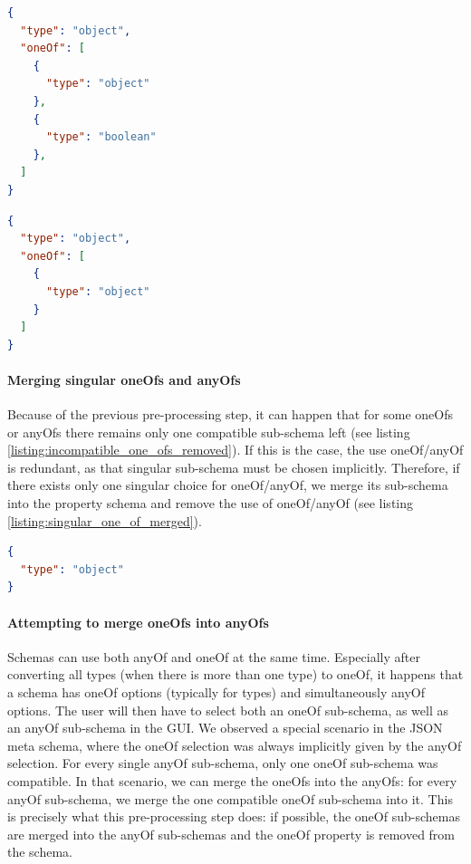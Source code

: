 \begin{lstlisting}[language=json, firstnumber=1, caption=
    {Simple JSON schema with incompatible oneOf option}, captionpos=b]
{
  "type": "object",
  "oneOf": [
    {
      "type": "object"
    },
    {
      "type": "boolean"
    },
  ]
}
\end{lstlisting}\label{listing:incompatible_one_ofs}


\begin{lstlisting}[language=json, firstnumber=1, caption=
    {Simple JSON schema with incompatible oneOf option removed}, captionpos=b]
{
  "type": "object",
  "oneOf": [
    {
      "type": "object"
    }
  ]
}
\end{lstlisting}\label{listing:incompatible_one_ofs_removed}


\paragraph{Merging singular oneOfs and anyOfs}
Because of the previous pre-processing step, it can happen that for some oneOfs or anyOfs there remains only one compatible sub-schema left (see listing \ref{listing:incompatible_one_ofs_removed}).
If this is the case, the use oneOf/anyOf is redundant, as that singular sub-schema must be chosen implicitly.
Therefore, if there exists only one singular choice for oneOf/anyOf, we merge its sub-schema into the property schema and remove the use of oneOf/anyOf (see listing \ref{listing:singular_one_of_merged}).

\begin{lstlisting}[language=json, firstnumber=1, caption=
    {Simple JSON schema with singular oneOf merged into property schema}, captionpos=b]
{
  "type": "object"
}
\end{lstlisting}\label{listing:singular_one_of_merged}


\paragraph{Attempting to merge oneOfs into anyOfs}
Schemas can use both anyOf and oneOf at the same time.
Especially after converting all types (when there is more than one type) to oneOf, it happens that a schema has oneOf options (typically for types) and simultaneously anyOf options.
The user will then have to select both an oneOf sub-schema, as well as an anyOf sub-schema in the GUI.
We observed a special scenario in the JSON meta schema, where the oneOf selection was always implicitly given by the anyOf selection.
For every single anyOf sub-schema, only one oneOf sub-schema was compatible.
In that scenario, we can merge the oneOfs into the anyOfs: for every anyOf sub-schema, we merge the one compatible oneOf sub-schema into it.
This is precisely what this pre-processing step does: if possible, the oneOf sub-schemas are merged into the anyOf sub-schemas and the oneOf property is removed from the schema.


